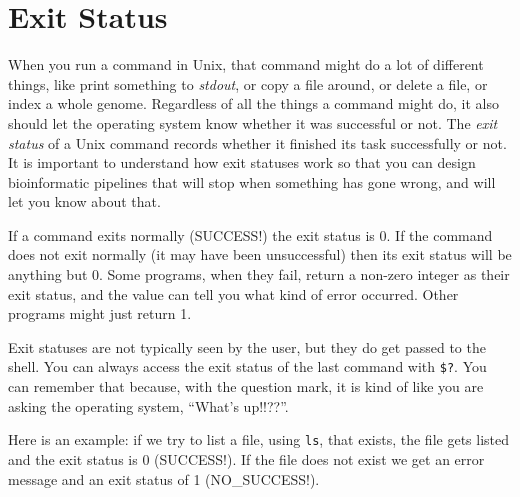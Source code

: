 \documentclass[]{krantz}
\makeatletter
\newenvironment{Shaded}{\begin{snugshade}}{\end{snugshade}}
\newcommand{\CommentTok}[1]{\textcolor[rgb]{0.37,0.37,0.37}{\textit{#1}}}
\newcommand{\ExtensionTok}[1]{#1}
\newcommand{\NormalTok}[1]{#1}
\newcommand{\VariableTok}[1]{\textcolor[rgb]{0,0,0}{#1}}
\newenvironment{kframe}{%
\medskip{}
\setlength{\fboxsep}{.8em}
 \def\at@end@of@kframe{}%
 \ifinner\ifhmode%
  \def\at@end@of@kframe{\end{minipage}}%
  \begin{minipage}{\columnwidth}%
 \fi\fi%
 \def\FrameCommand##1{\hskip\@totalleftmargin \hskip-\fboxsep
 \colorbox{shadecolor}{##1}\hskip-\fboxsep
     \hskip-\linewidth \hskip-\@totalleftmargin \hskip\columnwidth}%
 \MakeFramed {\advance\hsize-\width
   \@totalleftmargin\z@ \linewidth\hsize
   \@setminipage}}%
 {\par\unskip\endMakeFramed%
 \at@end@of@kframe}
\renewenvironment{Shaded}{\begin{kframe}}{\end{kframe}}
\makeatother
\begin{document}
\hypertarget{exit-status}{%
\section{Exit Status}\label{exit-status}}

When you run a command in Unix, that command might do a lot of different things,
like print something to \emph{stdout}, or copy a file around, or delete a file,
or index a whole genome. Regardless of all the things a command might do, it
also should let the operating system know whether it was successful or not. The
\emph{exit status} of a Unix command records whether it finished its task successfully
or not.
It is important to understand how exit statuses work so that you can
design bioinformatic pipelines that will stop when something has gone wrong, and will
let you know about that.

If a command exits normally (SUCCESS!) the exit status is 0. If the command does
not exit normally (it may have been unsuccessful) then its exit status will
be anything but 0. Some programs, when they fail, return a non-zero integer as their
exit status, and the value can tell you what kind of error occurred. Other programs might
just return 1.

Exit statuses are not typically seen by the user, but they do get passed to the
shell. You can always access the exit status of the last command with \texttt{\$?}. You can
remember that because, with the question mark, it is kind of like you are asking
the operating system, ``What's up!!??''.

Here is an example: if we try to list a file, using \texttt{ls}, that exists, the file gets listed
and the exit status is 0 (SUCCESS!). If the file does not exist we get an error message
and an exit status of 1 (NO\_SUCCESS!).

\begin{Shaded}
\end{Shaded}
\end{document}
